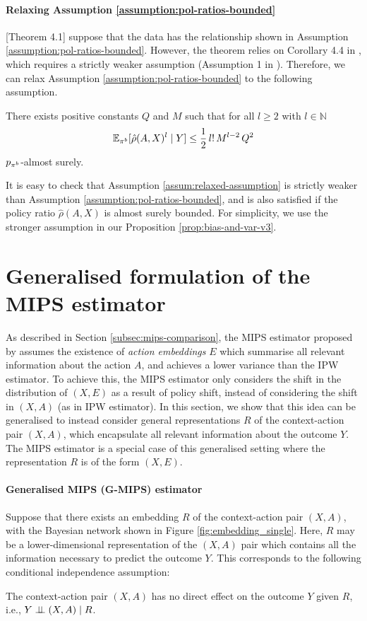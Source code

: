 \paragraph{Relaxing Assumption \ref{assumption:pol-ratios-bounded}}
\cite{lai2023generalization}[Theorem 4.1] suppose that the data has the relationship shown in Assumption \ref{assumption:pol-ratios-bounded}. However, the theorem relies on Corollary 4.4 in \cite{lin2020optimal}, which requires a strictly weaker assumption (Assumption 1 in \cite{lin2020optimal}). Therefore, we can relax Assumption \ref{assumption:pol-ratios-bounded} to the following assumption.
\begin{assumption}\label{assum:relaxed-assumption}
    There exists positive constants $Q$ and $M$ such that for all $l \geq 2$ with $l \in \mathbb{N}$
    \[
\mathbb{E}_{\pi^b}[\hat{\rho}(A, X)^l\mid Y] \leq \frac{1}{2} \,l!\,M^{l-2}\,Q^2 
    \]
    $p_{\pi^b}$-almost surely.
\end{assumption}
It is easy to check that Assumption \ref{assum:relaxed-assumption} is strictly weaker than Assumption \ref{assumption:pol-ratios-bounded}, and is also satisfied if the policy ratio $\hat{\rho}(A, X)$ is almost surely bounded. For simplicity, we use the stronger assumption in our Proposition \ref{prop:bias-and-var-v3}.  

\section{Generalised formulation of the MIPS estimator \citep{saito2022off}}\label{app:gmips}
As described in Section \ref{subsec:mips-comparison}, the MIPS estimator proposed by \cite{saito2022off} assumes the existence of \emph{action embeddings} $E$ which summarise all relevant information about the action $A$, and achieves a lower variance than the IPW estimator. To achieve this, the MIPS estimator only considers the shift in the distribution of $(X, E)$ as a result of policy shift, instead of considering the shift in $(X, A)$ (as in IPW estimator). In this section, we show that this idea can be generalised to instead consider general representations $R$ of the context-action pair $(X, A)$, which encapsulate all relevant information about the outcome $Y$. The MIPS estimator is a special case of this generalised setting where the representation $R$ is of the form $(X, E)$.

\paragraph{Generalised MIPS (G-MIPS) estimator}
Suppose that there exists an embedding $R$ of the context-action pair $(X, A)$, with the Bayesian network shown in Figure \ref{fig:embedding_single}. Here, $R$ may be a lower-dimensional representation of the $(X, A)$ pair which contains all the information necessary to predict the outcome $Y$. This corresponds to the following conditional independence assumption:
\begin{assumption}\label{assum:indep-general}
    The context-action pair $(X, A)$ has no direct effect on the outcome $Y$ given $R$, i.e., 
    $Y \perp \!\!\! \perp (X, A) \mid R$.
\end{assumption}


